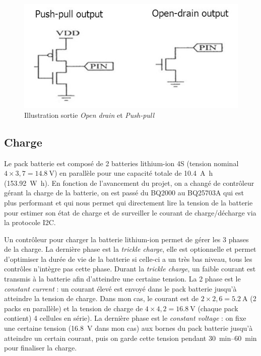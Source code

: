 \documentclass[a4paper, 12pt, sffamily]{report}
\begin{document}
\begin{figure}[H]
\centering
\includegraphics[scale=0.55]{figures/screenshots/opendrain_pushpull.png}
\caption{Illustration sortie \emph{Open drain} et \emph{Push-pull}} 
\label{fig:opendrain_pushpull}
\end{figure}

\subsection{Charge}
Le pack batterie est composé de 2 batteries lithium-ion 4S (tension nominal $4\times3,7=\SI{14.8}{\volt}$) en parallèle pour une capacité totale de \SI{10.4}{\ampere\hour} (\SI{153.92}{\watt\hour}). En fonction de l’avancement du projet, on a changé de contrôleur gérant la charge de la batterie, on est passé du BQ2000 au BQ25703A qui est plus performant et qui nous permet qui directement lire la tension de la batterie pour estimer son état de charge et de surveiller le courant de charge/décharge via la protocole I2C.

Un contrôleur pour charger la batterie lithium-ion permet de gérer les 3 phases de la charge. La dernière phase est la \emph{trickle charge}, elle est optionnelle et permet d’optimiser la durée de vie de la batterie si celle-ci a un très bas niveau, tous les contrôles n’intègre pas cette phase. Durant la \emph{trickle charge}, un faible courant est transmis à la batterie afin d’atteindre une certaine tension. La 2\ieme{} phase est le \emph{constant current} : un courant élevé est envoyé dans le pack batterie jusqu’à atteindre la tension de charge. Dans mon cas, le courant est de $2\times2,6 = \SI{5.2}{\ampere}$ (2 packs en parallèle) et la tension de charge de $4\times4,2 = \SI{16.8}{\volt}$ (chaque pack contient) 4 cellules en série). La dernière phase est le \emph{constant voltage} : on fixe une certaine tension (\SI{16.8}{\volt} dans mon cas) aux bornes du pack batterie jusqu’à atteindre un certain courant, puis on garde cette tension pendant \SIrange{30}{60}{\minute} pour finaliser la charge.
\end{document}
